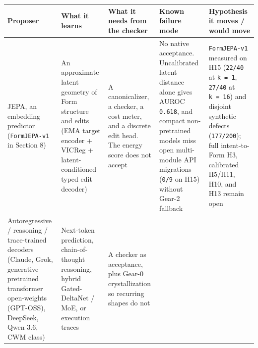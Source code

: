 \documentclass[10pt,letterpaper]{article}
\begin{document}
{\footnotesize\setlength{\tabcolsep}{3.8pt}\renewcommand{\arraystretch}{1.15}
\begin{longtable}[]{@{}
  >{\raggedright\arraybackslash}p{}
  >{\raggedright\arraybackslash}p{}
  >{\raggedright\arraybackslash}p{}
  >{\raggedright\arraybackslash}p{}
  >{\raggedright\arraybackslash}p{}@{}}
\toprule\noalign{}
\begin{minipage}[b]{\linewidth}\raggedright
\textbf{Proposer}
\end{minipage} & \begin{minipage}[b]{\linewidth}\raggedright
\textbf{What it learns}
\end{minipage} & \begin{minipage}[b]{\linewidth}\raggedright
\textbf{What it needs from the checker}
\end{minipage} & \begin{minipage}[b]{\linewidth}\raggedright
\textbf{Known failure mode}
\end{minipage} & \begin{minipage}[b]{\linewidth}\raggedright
\textbf{Hypothesis it moves / would move}
\end{minipage} \\
\midrule\noalign{}
\endhead
\bottomrule\noalign{}
\endlastfoot
JEPA, an embedding predictor (\texttt{FormJEPA-\allowbreak{}v1} in Section 8) & An
approximate latent geometry of Form structure and edits (EMA target
encoder + VICReg + latent-conditioned typed edit decoder) & A
canonicalizer, a checker, a cost meter, and a discrete edit head. The
energy score does not accept & No native acceptance. Uncalibrated latent
distance alone gives AUROC \texttt{0.618}, and compact non-pretrained
models miss open multi-module API migrations (\texttt{0/9} on H15)
without Gear-2 fallback & \texttt{FormJEPA-\allowbreak{}v1} measured on H15
(\texttt{22/40} at \texttt{k\ =\ 1}, \texttt{27/40} at
\texttt{k\ =\ 16}) and disjoint synthetic defects (\texttt{177/200});
full intent-to-Form H3, calibrated H5/H11, H10, and H13 remain open \\
Autoregressive / reasoning / trace-trained decoders (Claude, Grok,
generative pretrained transformer open-weights (GPT-OSS), DeepSeek, Qwen
3.6, CWM class) & Next-token prediction, chain-of-thought reasoning,
hybrid Gated-DeltaNet / MoE, or execution traces & A checker as
acceptance, plus Gear-0 crystallization so recurring shapes do not

\end{longtable}}
\end{document}
